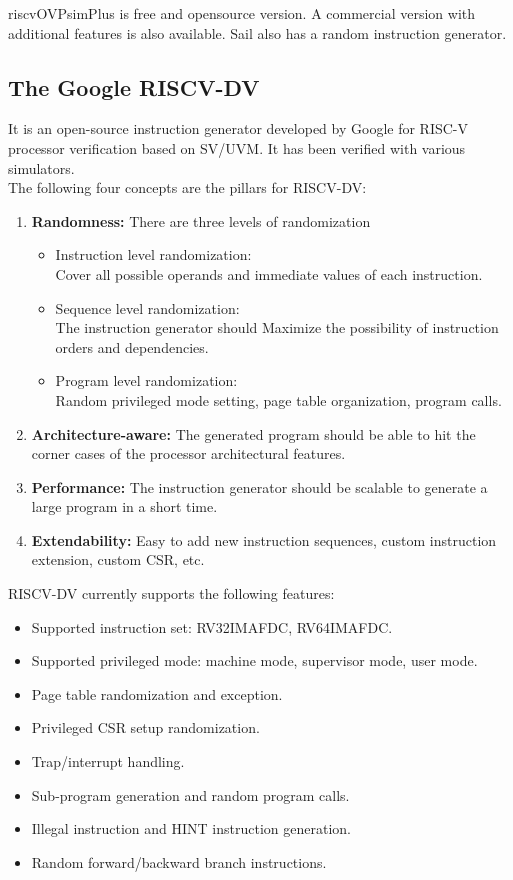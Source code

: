 \documentclass[../main.tex]{subfiles}
\begin{document}
\noindent riscvOVPsimPlus is free and opensource version. A commercial version with additional features is also available. Sail also has a random instruction generator.


\subsection{The Google RISCV-DV}
It is an open-source instruction generator developed by Google for RISC-V processor verification based on SV/UVM. It has been verified with various simulators.\\
The following four concepts are the pillars for RISCV-DV:
\begin{enumerate}
\item \textbf{Randomness:} There are three levels of randomization
\begin{itemize}
    \item Instruction level randomization:\\
  Cover all possible operands and immediate values of each instruction.
   \item  Sequence level randomization:\\
   The instruction generator should Maximize the possibility of instruction orders and dependencies.
   \item Program level randomization:\\
     Random privileged mode setting, page table organization, program calls.
\end{itemize}
\item \textbf{Architecture-aware:} The generated program should be able to hit the corner cases of the processor architectural features.
\item \textbf{Performance:} The instruction generator should be scalable to generate a large program in a short time.
\item \textbf{Extendability:} Easy to add new instruction sequences, custom instruction extension, custom CSR, etc.
\end{enumerate}

 \noindent RISCV-DV currently supports the following features:

\begin{itemize}
\item 	Supported instruction set: RV32IMAFDC, RV64IMAFDC.
\item 	Supported privileged mode: machine mode, supervisor mode, user mode.
\item 	Page table randomization and exception.
\item 	Privileged CSR setup randomization.
\item 	Trap/interrupt handling.
\item 	Sub-program generation and random program calls.
\item 	Illegal instruction and HINT instruction generation.
\item 	Random forward/backward branch instructions.
\end{itemize}
\end{document}
